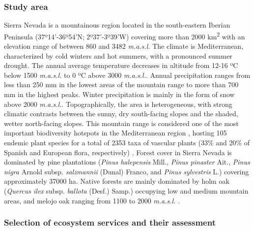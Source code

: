 \subsubsection{Study area}\label{sec:es:mat-studyarea}
Sierra Nevada is a mountainous region located in the south-eastern Iberian Peninsula (37º14'-36º54'N; 2º37'-3º39'W) covering more than 2000 km\textsuperscript{2} with an elevation range of between 860 and 3482 \emph{m.a.s.l.} The climate is Mediterranean, characterized by cold winters and hot summers, with a pronounced summer drought. The annual average temperature decreases in altitude from 12-16 ºC below 1500 \emph{m.a.s.l.} to 0 ºC above 3000 \emph{m.a.s.l.}. Annual precipitation ranges from less than 250 mm in the lowest areas of the mountain range to more than 700 mm in the highest peaks. Winter precipitation is mainly in the form of snow above 2000 \emph{m.a.s.l.}. Topographically, the area is heterogeneous, with strong climatic contrasts between the sunny, dry south-facing slopes and the shaded, wetter north-facing slopes. This mountain range is considered one of the most important biodiversity hotspots in the Mediterranean region \autocite{Blancaetal1998ThreatenedVascular}, hosting 105 endemic plant species for a total of 2353 taxa of vascular plants (33\% and 20\% of Spanish and European flora, respectively) \autocite{Lorite2016UpdatedChecklist}. Forest cover in Sierra Nevada is dominated by pine plantations (\emph{Pinus halepensis} Mill., \emph{Pinus pinaster} Ait., \emph{Pinus nigra} Arnold subsp. \emph{salzmannii} (Dunal) Franco, and \emph{Pinus sylvestris} L.) covering approximately 37000 ha. Native forests are mainly dominated by holm oak (\emph{Quercus ilex} subsp. \emph{ballota} (Desf.) Samp.) occupying low and medium mountain areas, and melojo oak ranging from 1100 to 2000 \emph{m.a.s.l.} \autocite{PerezLuqueetal2019MapEcosystems}.

\subsubsection{Selection of ecosystem services and their assessment }\label{sec:es:mat-selection}

